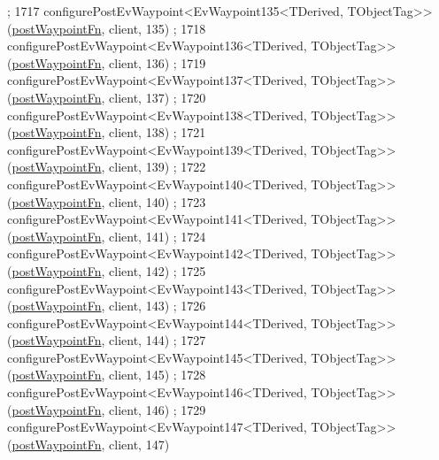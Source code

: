 \begin{DoxyCode}
      ;
1717     configurePostEvWaypoint<EvWaypoint135<TDerived, TObjectTag>>(\hyperlink{classcl__move__base__z_1_1WaypointEventDispatcher_a964a57fcce5d48ec60243230722d8dd7}{postWaypointFn}, client, 135)
      ;
1718     configurePostEvWaypoint<EvWaypoint136<TDerived, TObjectTag>>(\hyperlink{classcl__move__base__z_1_1WaypointEventDispatcher_a964a57fcce5d48ec60243230722d8dd7}{postWaypointFn}, client, 136)
      ;
1719     configurePostEvWaypoint<EvWaypoint137<TDerived, TObjectTag>>(\hyperlink{classcl__move__base__z_1_1WaypointEventDispatcher_a964a57fcce5d48ec60243230722d8dd7}{postWaypointFn}, client, 137)
      ;
1720     configurePostEvWaypoint<EvWaypoint138<TDerived, TObjectTag>>(\hyperlink{classcl__move__base__z_1_1WaypointEventDispatcher_a964a57fcce5d48ec60243230722d8dd7}{postWaypointFn}, client, 138)
      ;
1721     configurePostEvWaypoint<EvWaypoint139<TDerived, TObjectTag>>(\hyperlink{classcl__move__base__z_1_1WaypointEventDispatcher_a964a57fcce5d48ec60243230722d8dd7}{postWaypointFn}, client, 139)
      ;
1722     configurePostEvWaypoint<EvWaypoint140<TDerived, TObjectTag>>(\hyperlink{classcl__move__base__z_1_1WaypointEventDispatcher_a964a57fcce5d48ec60243230722d8dd7}{postWaypointFn}, client, 140)
      ;
1723     configurePostEvWaypoint<EvWaypoint141<TDerived, TObjectTag>>(\hyperlink{classcl__move__base__z_1_1WaypointEventDispatcher_a964a57fcce5d48ec60243230722d8dd7}{postWaypointFn}, client, 141)
      ;
1724     configurePostEvWaypoint<EvWaypoint142<TDerived, TObjectTag>>(\hyperlink{classcl__move__base__z_1_1WaypointEventDispatcher_a964a57fcce5d48ec60243230722d8dd7}{postWaypointFn}, client, 142)
      ;
1725     configurePostEvWaypoint<EvWaypoint143<TDerived, TObjectTag>>(\hyperlink{classcl__move__base__z_1_1WaypointEventDispatcher_a964a57fcce5d48ec60243230722d8dd7}{postWaypointFn}, client, 143)
      ;
1726     configurePostEvWaypoint<EvWaypoint144<TDerived, TObjectTag>>(\hyperlink{classcl__move__base__z_1_1WaypointEventDispatcher_a964a57fcce5d48ec60243230722d8dd7}{postWaypointFn}, client, 144)
      ;
1727     configurePostEvWaypoint<EvWaypoint145<TDerived, TObjectTag>>(\hyperlink{classcl__move__base__z_1_1WaypointEventDispatcher_a964a57fcce5d48ec60243230722d8dd7}{postWaypointFn}, client, 145)
      ;
1728     configurePostEvWaypoint<EvWaypoint146<TDerived, TObjectTag>>(\hyperlink{classcl__move__base__z_1_1WaypointEventDispatcher_a964a57fcce5d48ec60243230722d8dd7}{postWaypointFn}, client, 146)
      ;
1729     configurePostEvWaypoint<EvWaypoint147<TDerived, TObjectTag>>(\hyperlink{classcl__move__base__z_1_1WaypointEventDispatcher_a964a57fcce5d48ec60243230722d8dd7}{postWaypointFn}, client, 147)

\end{DoxyCode}
